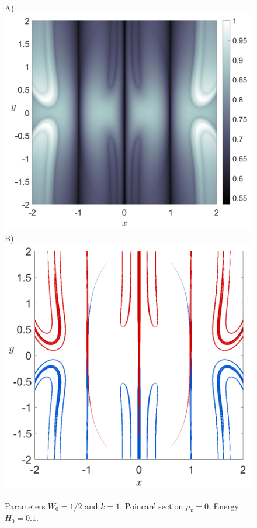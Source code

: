 \documentclass[10pt,aps,onecolumn,superscriptaddress]{revtex4-2}
\begin{document}
\begin{figure}[htbp]
	A)\includegraphics[scale=0.28]{H_01_LD_tau_12_px_0.png}
	B)\includegraphics[scale=0.28]{H_01_mani_tau_12_px_0.png}	
	\caption{Parameters $W_0 = 1/2$ and $k = 1$. Poincar\'e section $p_x = 0$. Energy $H_0 = 0.1$.}
	\label{fig:ld_mani_px_0}
\end{figure}
\end{document}
